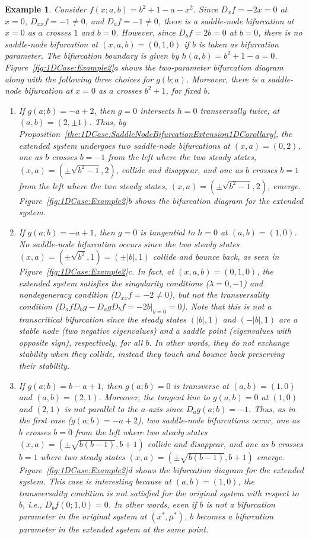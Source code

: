 \documentclass[12pt]{article}
\newtheorem{example}{Example}
\begin{document}
\begin{example}
    \label{exa:1DCase:Example2}
    Consider $f(x;a,b) = b^{2}+1 -a -x^2$. Since $D_{x}f=-2x=0$ at $x=0$, $D_{xx}f=-1\neq 0$, and $D_{a}f=-1\neq0$, there is a saddle-node bifurcation at $x=0$ as $a$ crosses $1$ and $b=0$. However, since $D_{b}f=2b=0$ at $b=0$, there is no saddle-node bifurcation at $(x,a,b)=(0,1,0)$ if $b$ is taken as bifurcation parameter. The bifurcation boundary is given by $h(a,b)=b^2+1-a=0$. Figure~\ref{fig:1DCase:Example2}a shows the two-parameter bifurcation diagram along with the following three choices for $g(b;a)$. Moreover, there is a saddle-node bifurcation at $x=0$ as $a$ crosses $b^{2}+1$, for fixed $b$.
    \begin{enumerate}
        \item If $g(a;b) = -a+2$, then $g=0$ intersects $h=0$ transversally twice, at $(a,b)=(2,\pm 1)$. Thus, by Proposition~\ref{the:1DCase:SaddleNodeBifurcationExtension1DCorollary}, the extended system undergoes two saddle-node bifurcations at $(x,a)=(0,2)$, one as $b$ crosses $b=-1$ from the left where the two steady states, $(x,a)=(\pm\sqrt{b^{2}-1},2)$, collide and disappear, and one as $b$ crosses $b=1$ from the left where the two steady states, $(x,a)=(\pm\sqrt{b^{2}-1},2)$, emerge. Figure~\ref{fig:1DCase:Example2}b shows the bifurcation diagram for the extended system.
        \item If $g(a;b) = -a+1$, then $g=0$ is tangential to $h=0$ at $(a,b)=(1,0)$. No saddle-node bifurcation occurs since the two steady states $(x,a)=(\pm\sqrt{b^{2}},1)=(\pm|b|,1)$ collide and bounce back, as seen in Figure~\ref{fig:1DCase:Example2}c. In fact, at $(x,a,b)=(0,1,0)$, the extended system satisfies the singularity conditions ($\lambda=0,-1$) and nondegeneracy condition ($D_{xx}f=-2\neq 0$), but not the transversality condition ($D_{a}fD_{b}g-D_{a}gD_{b}f=-2b|_{b=0}=0$). Note that this is not a transcritical bifurcation since the steady states $(|b|,1)$ and $(-|b|,1)$ are a stable node (two negative eigenvalues) and a saddle point (eigenvalues with opposite sign), respectively, for all $b$. In other words, they do not exchange stability when they collide, instead they touch and bounce back preserving their stability.
        \item If $g(a;b)=b-a+1$, then $g(a;b)=0$ is transverse at $(a,b)=(1,0)$ and $(a,b)=(2,1)$. Moreover, the tangent line to $g(a,b)=0$ at $(1,0)$ and $(2,1)$ is not parallel to the $a$-axis since $D_{a}g(a;b)=-1$. Thus, as in the first case ($g(a;b)=-a+2$), two saddle-node bifurcations occur, one as $b$ crosses $b=0$ from the left where two steady states $(x,a)=(\pm\sqrt{b(b-1)},b+1)$ collide and disappear, and one as $b$ crosses $b=1$ where two steady states $(x,a)=(\pm\sqrt{b(b-1)},b+1)$ emerge. Figure~\ref{fig:1DCase:Example2}d shows the bifurcation diagram for the extended system. This case is interesting because at $(a,b)=(1,0)$, the transversality condition is not satisfied for the original system with respect to $b$, i.e., $D_{b}f(0;1,0)=0$. In other words, even if $b$ is not a bifurcation parameter in the original system at $(x^{*},\mu^{*})$, $b$ becomes a bifurcation parameter in the extended system at the same point.

\end{enumerate}
\end{example}
\end{document}
